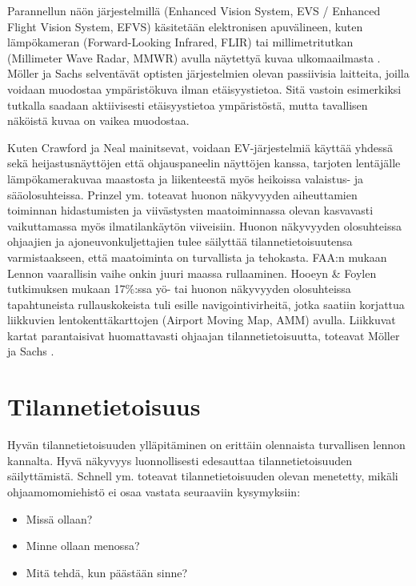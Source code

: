 \documentclass[utf8,bachelor,manualbib]{gradu3}
\begin{document}
Parannellun näön järjestelmillä (Enhanced Vision System, EVS / Enhanced Flight Vision System, EFVS) käsitetään elektronisen apuvälineen, kuten lämpökameran (Forward-Looking Infrared, FLIR) tai millimetritutkan (Millimeter Wave Radar, MMWR) avulla näytettyä kuvaa ulkomaailmasta \citep{baileyym2007}. Möller ja Sachs \citeyearpar{mollersachs1994} selventävät optisten järjestelmien olevan passiivisia laitteita, joilla voidaan muodostaa ympäristökuva ilman etäisyystietoa. Sitä vastoin esimerkiksi tutkalla saadaan aktiivisesti etäisyystietoa ympäristöstä, mutta tavallisen näköistä kuvaa on vaikea muodostaa.

Kuten Crawford ja Neal \citeyearpar{crawfordneal2006} mainitsevat, voidaan EV-järjestelmiä käyttää yhdessä sekä heijastusnäyttöjen että ohjauspaneelin näyttöjen kanssa, tarjoten lentäjälle lämpökamerakuvaa maastosta ja liikenteestä myös heikoissa valaistus- ja sääolosuhteissa. Prinzel ym. \citeyearpar{prinzelym2013} toteavat huonon näkyvyyden aiheuttamien toiminnan hidastumisten ja viivästysten maatoiminnassa olevan kasvavasti vaikuttamassa myös ilmatilankäytön viiveisiin. Huonon näkyvyyden olosuhteissa ohjaajien ja ajoneuvonkuljettajien tulee säilyttää tilannetietoisuutensa varmistaakseen, että maatoiminta on turvallista ja tehokasta. FAA:n mukaan \citeyearpar{gerold2001} Lennon vaarallisin vaihe onkin juuri maassa rullaaminen. Hooeyn \& Foylen \citeyearpar{hooey2007} tutkimuksen mukaan 17\%:ssa yö- tai huonon näkyvyyden olosuhteissa tapahtuneista rullauskokeista tuli esille navigointivirheitä, jotka saatiin korjattua liikkuvien lentokenttäkarttojen (Airport Moving Map, AMM) avulla. Liikkuvat kartat parantaisivat huomattavasti ohjaajan tilannetietoisuutta, toteavat Möller ja Sachs \citeyearpar{mollersachs1994}.

\section{Tilannetietoisuus}

Hyvän tilannetietoisuuden ylläpitäminen on erittäin olennaista turvallisen lennon kannalta. Hyvä näkyvyys luonnollisesti edesauttaa tilannetietoisuuden säilyttämistä. Schnell ym. \citeyearpar{schnellym2004} toteavat tilannetietoisuuden olevan menetetty, mikäli ohjaamomomiehistö ei osaa vastata seuraaviin kysymyksiin:

\begin{itemize}
\item Missä ollaan?
\item Minne ollaan menossa?
\item Mitä tehdä, kun päästään sinne?
\end{itemize}
\end{document}
